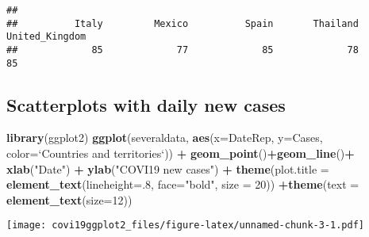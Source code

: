 \documentclass[]{article}
\newenvironment{Shaded}{\begin{snugshade}}{\end{snugshade}}
\newcommand{\DataTypeTok}[1]{\textcolor[rgb]{0.13,0.29,0.53}{#1}}
\newcommand{\DecValTok}[1]{\textcolor[rgb]{0.00,0.00,0.81}{#1}}
\newcommand{\KeywordTok}[1]{\textcolor[rgb]{0.13,0.29,0.53}{\textbf{#1}}}
\newcommand{\NormalTok}[1]{#1}
\newcommand{\OperatorTok}[1]{\textcolor[rgb]{0.81,0.36,0.00}{\textbf{#1}}}
\newcommand{\StringTok}[1]{\textcolor[rgb]{0.31,0.60,0.02}{#1}}
\begin{document}
\begin{verbatim}
## 
##          Italy         Mexico          Spain       Thailand United_Kingdom 
##             85             77             85             78             85
\end{verbatim}

\hypertarget{scatterplots-with-daily-new-cases}{%
\subsection{Scatterplots with daily new
cases}\label{scatterplots-with-daily-new-cases}}

\begin{Shaded}
\begin{Highlighting}[]
\KeywordTok{library}\NormalTok{(ggplot2)}
\KeywordTok{ggplot}\NormalTok{(severaldata, }\KeywordTok{aes}\NormalTok{(}\DataTypeTok{x=}\NormalTok{DateRep, }\DataTypeTok{y=}\NormalTok{Cases, }\DataTypeTok{color=}\StringTok{`}\DataTypeTok{Countries and territories}\StringTok{`}\NormalTok{)) }\OperatorTok{+}
\StringTok{  }\KeywordTok{geom_point}\NormalTok{()}\OperatorTok{+}\KeywordTok{geom_line}\NormalTok{()}\OperatorTok{+}\StringTok{  }
\StringTok{  }\KeywordTok{xlab}\NormalTok{(}\StringTok{"Date"}\NormalTok{) }\OperatorTok{+}\StringTok{ }\KeywordTok{ylab}\NormalTok{(}\StringTok{"COVI19 new cases"}\NormalTok{) }\OperatorTok{+}
\StringTok{  }\KeywordTok{theme}\NormalTok{(}\DataTypeTok{plot.title =} \KeywordTok{element_text}\NormalTok{(}\DataTypeTok{lineheight=}\NormalTok{.}\DecValTok{8}\NormalTok{, }\DataTypeTok{face=}\StringTok{"bold"}\NormalTok{, }\DataTypeTok{size =} \DecValTok{20}\NormalTok{)) }\OperatorTok{+}\KeywordTok{theme}\NormalTok{(}\DataTypeTok{text =} \KeywordTok{element_text}\NormalTok{(}\DataTypeTok{size=}\DecValTok{12}\NormalTok{))}
\end{Highlighting}
\end{Shaded}

\texttt{[image: covi19ggplot2\_files/figure-latex/unnamed-chunk-3-1.pdf]}
\end{document}
